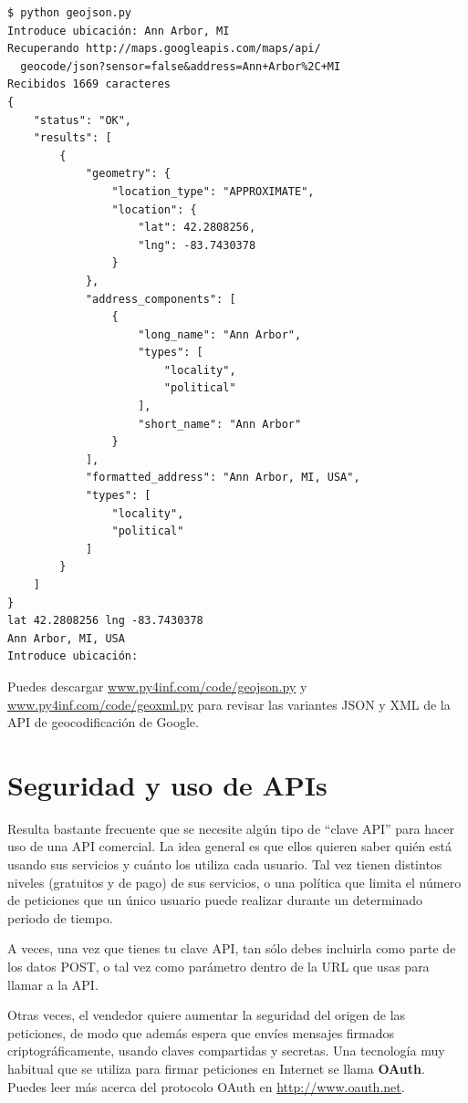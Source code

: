 \beforeverb
\begin{verbatim}
$ python geojson.py
Introduce ubicación: Ann Arbor, MI
Recuperando http://maps.googleapis.com/maps/api/
  geocode/json?sensor=false&address=Ann+Arbor%2C+MI
Recibidos 1669 caracteres
{
    "status": "OK", 
    "results": [
        {
            "geometry": {
                "location_type": "APPROXIMATE", 
                "location": {
                    "lat": 42.2808256, 
                    "lng": -83.7430378
                }
            }, 
            "address_components": [
                {
                    "long_name": "Ann Arbor", 
                    "types": [
                        "locality", 
                        "political"
                    ], 
                    "short_name": "Ann Arbor"
                } 
            ], 
            "formatted_address": "Ann Arbor, MI, USA", 
            "types": [
                "locality", 
                "political"
            ]
        }
    ]
}
lat 42.2808256 lng -83.7430378
Ann Arbor, MI, USA
Introduce ubicación:
\end{verbatim}
\afterverb
%
Puedes descargar
\url{www.py4inf.com/code/geojson.py} y
\url{www.py4inf.com/code/geoxml.py} para revisar
las variantes JSON y XML de la API de geocodificación de Google.

\section{Seguridad y uso de APIs}

Resulta bastante frecuente que se necesite algún tipo de
``clave API'' para hacer uso de una API comercial. La
idea general es que ellos quieren saber quién está usando
sus servicios y cuánto los utiliza cada usuario.
Tal vez tienen distintos niveles (gratuitos y de pago) de sus servicios,
o una política que limita el número de peticiones
que un único usuario puede realizar durante un determinado
periodo de tiempo.

A veces, una vez que tienes tu clave API, tan sólo debes incluirla
como parte de los datos POST, o tal vez como parámetro
dentro de la URL que usas para llamar a la API.

Otras veces, el vendedor quiere aumentar la seguridad del
origen de las peticiones, de modo que además espera que
envíes mensajes firmados criptográficamente, usando claves
compartidas y secretas. Una tecnología muy habitual que se utiliza
para firmar peticiones en Internet se llama {\bf OAuth}.
Puedes leer más acerca del protocolo OAuth en 
\url{http://www.oauth.net}.

